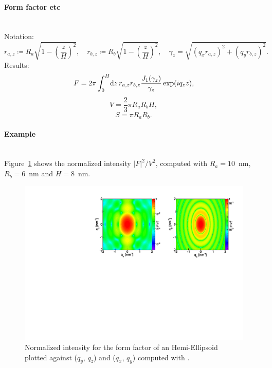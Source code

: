 \paragraph{Form factor etc}\strut\\
Notation:
\begin{equation*}
 r_{a,z} \coloneqq R_a \sqrt{1-\left(\dfrac{z}{H} \right)^2},\quad
 r_{b,z} \coloneqq R_b \sqrt{1-\left(\dfrac{z}{H} \right)^2}, \quad
 \gamma_z =\sqrt{(q_x r_{a,z})^2+(q_y r_{b,z})^2}.
\end{equation*}
Results:
\begin{equation*}
  F = 2\pi \int_0^{H} \!\text{d} z\, r_{a,z} r_{b,z}
                               \frac{J_1(\gamma_z)}{\gamma_z}\exp(iq_z z),
\end{equation*}
\begin{equation*}
  V = \dfrac{2}{3}\pi R_a R_bH,
\end{equation*}
\begin{equation*}
  S =\pi R_a R_b.
\end{equation*}

\paragraph{Example}\strut\\
Figure~\ref{fig:FFhemiellipsEx} shows the normalized intensity
$|F|^2/V^2$, computed with $R_a=10$~nm, $R_b=6$~nm and $H=8$~nm.

\begin{figure}[h]
\begin{center}
\includegraphics[angle=-90,width=\textwidth]{fig/ff/figffhemiellips.pdf}
\end{center}
\caption{Normalized intensity for the form factor of an Hemi-Ellipsoid plotted against ($q_y$, $q_z$) and  ($q_x$, $q_y$)
  computed with .}
\label{fig:FFhemiellipsEx}
\end{figure}

